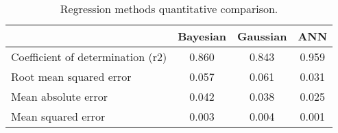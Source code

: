 \begin{table}[htbp]
  \centering

    \begin{tabular}{lccc}
    \hline
          & Bayesian & Gaussian & ANN \\
          \hline
    Coefficient of determination (\acs{r2}) & 0.860  & 0.843 & 0.959 \\
    Root mean squared error & 0.057 & 0.061 & 0.031 \\
    Mean absolute error & 0.042 & 0.038 & 0.025 \\
    Mean squared error & 0.003 & 0.004 & 0.001 \\
    \hline
    \end{tabular}%
      \caption{Regression methods quantitative comparison.}
  \label{tab:15regressionvalues}%
\end{table}%